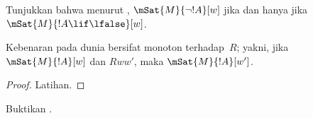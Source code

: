 \documentclass[../../../include/open-logic-section]{subfiles}
\begin{document}
\begin{prob}
  Tunjukkan bahwa menurut ,
  $\mSat{M}{\lnot !A}[w]$ jika dan hanya jika $\mSat{M}{!A \lif
  \lfalse}[w]$.
\end{prob}

\begin{prop}
  Kebenaran pada dunia bersifat monoton terhadap~$R$; yakni, jika
  $\mSat{M}{!A}[w]$ dan $Rww'$, maka $\mSat{M}{!A}[w']$.
\end{prop}

\begin{proof}
  Latihan.
\end{proof}

\begin{prob}
  Buktikan .
\end{prob}
\end{document}
